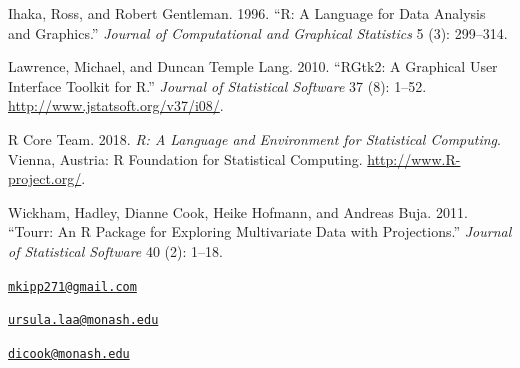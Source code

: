 \leavevmode\hypertarget{ref-ihaka:1996}{}%
Ihaka, Ross, and Robert Gentleman. 1996. ``R: A Language for Data
Analysis and Graphics.'' \emph{Journal of Computational and Graphical
Statistics} 5 (3): 299--314.

\leavevmode\hypertarget{ref-RGtk2}{}%
Lawrence, Michael, and Duncan Temple Lang. 2010. ``RGtk2: A Graphical
User Interface Toolkit for R.'' \emph{Journal of Statistical Software}
37 (8): 1--52. \url{http://www.jstatsoft.org/v37/i08/}.

\leavevmode\hypertarget{ref-R}{}%
R Core Team. 2018. \emph{R: A Language and Environment for Statistical
Computing}. Vienna, Austria: R Foundation for Statistical Computing.
\url{http://www.R-project.org/}.

\leavevmode\hypertarget{ref-tourr}{}%
Wickham, Hadley, Dianne Cook, Heike Hofmann, and Andreas Buja. 2011.
``Tourr: An R Package for Exploring Multivariate Data with
Projections.'' \emph{Journal of Statistical Software} 40 (2): 1--18.



\address{%
Michael Kipp\\
Monash University\\
Department of Econometrics and Business Statistics\\
}
\href{mailto:mkipp271@gmail.com}{\nolinkurl{mkipp271@gmail.com}}

\address{%
Ursula Laa\\
Monash University\\
School of Physics and Astronomy\\
}
\href{mailto:ursula.laa@monash.edu}{\nolinkurl{ursula.laa@monash.edu}}

\address{%
Dianne Cook\\
Monash University\\
Department of Econometrics and Business Statistics\\
}
\href{mailto:dicook@monash.edu}{\nolinkurl{dicook@monash.edu}}

